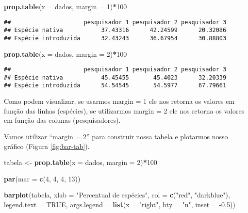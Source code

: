 \documentclass[titlepage, oneside, openany, a4paper]{book}
\newenvironment{Shaded}{\begin{snugshade}}{\end{snugshade}}
\newcommand{\DataTypeTok}[1]{\textcolor[rgb]{0.13,0.29,0.53}{#1}}
\newcommand{\DecValTok}[1]{\textcolor[rgb]{0.00,0.00,0.81}{#1}}
\newcommand{\FloatTok}[1]{\textcolor[rgb]{0.00,0.00,0.81}{#1}}
\newcommand{\KeywordTok}[1]{\textcolor[rgb]{0.13,0.29,0.53}{\textbf{#1}}}
\newcommand{\NormalTok}[1]{#1}
\newcommand{\OperatorTok}[1]{\textcolor[rgb]{0.81,0.36,0.00}{\textbf{#1}}}
\newcommand{\OtherTok}[1]{\textcolor[rgb]{0.56,0.35,0.01}{#1}}
\newcommand{\StringTok}[1]{\textcolor[rgb]{0.31,0.60,0.02}{#1}}
\begin{document}
\begin{Shaded}
\begin{Highlighting}[]
\KeywordTok{prop.table}\NormalTok{(}\DataTypeTok{x =}\NormalTok{ dados, }\DataTypeTok{margin =} \DecValTok{1}\NormalTok{)}\OperatorTok{*}\DecValTok{100}
\end{Highlighting}
\end{Shaded}

\begin{verbatim}
##                     pesquisador 1 pesquisador 2 pesquisador 3
## Espécie nativa           37.43316      42.24599      20.32086
## Espécie introduzida      32.43243      36.67954      30.88803
\end{verbatim}

\begin{Shaded}
\begin{Highlighting}[]
\KeywordTok{prop.table}\NormalTok{(}\DataTypeTok{x =}\NormalTok{ dados, }\DataTypeTok{margin =} \DecValTok{2}\NormalTok{)}\OperatorTok{*}\DecValTok{100}
\end{Highlighting}
\end{Shaded}

\begin{verbatim}
##                     pesquisador 1 pesquisador 2 pesquisador 3
## Espécie nativa           45.45455       45.4023      32.20339
## Espécie introduzida      54.54545       54.5977      67.79661
\end{verbatim}

Como podem visualizar, se usarmos margin = 1 ele nos retorna os valores em função das linhas (espécies), se utilizarmos margin = 2 ele nos retorna os valores em função das colunas (pesquisadores).

Vamos utilizar ``margin = 2'' para construir nossa tabela e plotarmos nosso gráfico (Figura \ref{fig:bar-tab}).

\begin{Shaded}
\begin{Highlighting}[]
\NormalTok{tabela <-}\StringTok{ }\KeywordTok{prop.table}\NormalTok{(}\DataTypeTok{x =}\NormalTok{ dados, }\DataTypeTok{margin =} \DecValTok{2}\NormalTok{)}\OperatorTok{*}\DecValTok{100}

\KeywordTok{par}\NormalTok{(}\DataTypeTok{mar =} \KeywordTok{c}\NormalTok{(}\DecValTok{4}\NormalTok{, }\DecValTok{4}\NormalTok{, }\DecValTok{4}\NormalTok{, }\DecValTok{13}\NormalTok{))}

\KeywordTok{barplot}\NormalTok{(tabela, }
        \DataTypeTok{xlab =} \StringTok{"Percentual de espécies"}\NormalTok{,}
        \DataTypeTok{col =} \KeywordTok{c}\NormalTok{(}\StringTok{"red"}\NormalTok{, }\StringTok{"darkblue"}\NormalTok{), }
        \DataTypeTok{legend.text =} \OtherTok{TRUE}\NormalTok{, }
        \DataTypeTok{args.legend =} \KeywordTok{list}\NormalTok{(}\DataTypeTok{x =} \StringTok{"right"}\NormalTok{, }\DataTypeTok{bty =} \StringTok{"n"}\NormalTok{, }\DataTypeTok{inset =} \FloatTok{-0.5}\NormalTok{))}
\end{Highlighting}
\end{Shaded}
\end{document}
